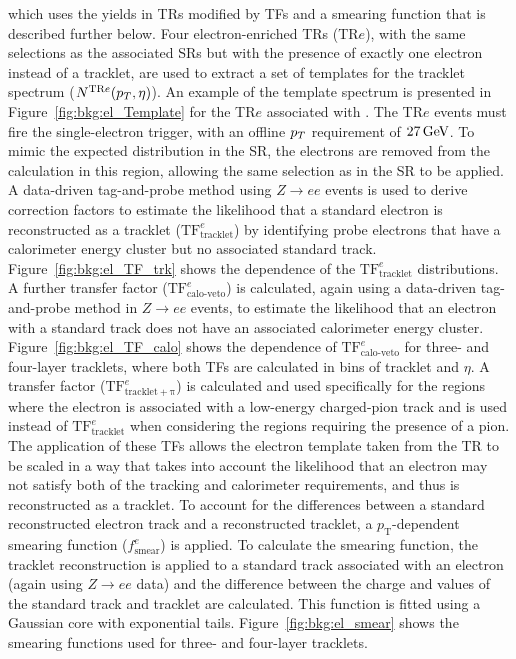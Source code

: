 which uses the yields in TRs modified by TFs and a smearing function that is described further below. Four electron-enriched TRs (TR$e$), with the same selections as the associated SRs but with the presence of exactly one electron instead of a tracklet, are used to extract a set of templates for the tracklet \pt spectrum ($N^{\mathrm{TR}e}(p_T,\eta)$). An example of the template \pt spectrum is presented in Figure~\ref{fig:bkg:el_Template} for the TR$e$ associated with \SRAh. The TR$e$ events must fire the single-electron trigger, with an offline $p_T$ requirement of $27\,\text{GeV}$. To mimic the expected \met distribution in the SR, the electrons are removed from the \met calculation in this region, allowing the same \met selection as in the SR to be applied. A data-driven tag-and-probe method using $Z\rightarrow ee$ events is used to derive correction factors to estimate the likelihood that a standard electron is reconstructed as a tracklet ($\mathrm{TF}^e_{\mathrm{tracklet}}$) by identifying probe electrons that have a calorimeter energy cluster but no associated standard track. Figure~\ref{fig:bkg:el_TF_trk} shows the \pt dependence of the $\mathrm{TF}^e_{\mathrm{tracklet}}$ distributions. A further transfer factor ($\mathrm{TF}^{e}_{\textrm{calo-veto}}$) is calculated, again using a data-driven tag-and-probe method in $Z\rightarrow ee$ events, to estimate the likelihood that an electron with a standard track does not have an associated calorimeter energy cluster. Figure~\ref{fig:bkg:el_TF_calo} shows the \pt dependence of $\mathrm{TF}^{e}_{\textrm{calo-veto}}$ for three- and four-layer tracklets, where both TFs are calculated in bins of tracklet \pt and $\eta$. A transfer factor ($\mathrm{TF}^{e}_{\mathrm{tracklet+\pi}}$) is calculated and used specifically for the regions where the electron is associated with a low-energy charged-pion track and is used instead of $\mathrm{TF}^e_{\mathrm{tracklet}}$ when considering the regions requiring the presence of a pion. The application of these TFs allows the electron \pt template taken from the TR to be scaled in a way that takes into account the likelihood that an electron may not satisfy both of the tracking and calorimeter requirements, and thus is reconstructed as a tracklet. To account for the differences between a standard reconstructed electron track and a reconstructed tracklet, a $p_{\mathrm{T}}$-dependent smearing function ($f^{e}_{\mathrm{smear}}$) is applied. To calculate the smearing function, the tracklet reconstruction is applied to a standard track associated with an electron (again using $Z\rightarrow ee$ data) and the difference between the charge and \pt values of the standard track and tracklet are calculated. This function is fitted using a Gaussian core with exponential tails. Figure~\ref{fig:bkg:el_smear} shows the smearing functions used for three- and four-layer tracklets.


